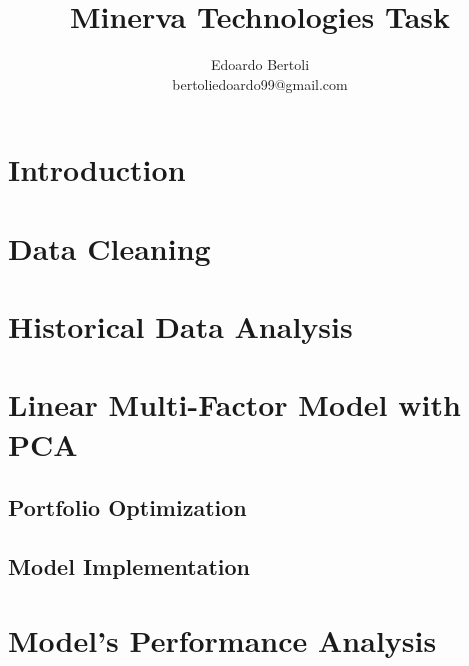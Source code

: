\documentclass[a4paper,11pt]{article}
\title{Minerva Technologies Task}
\author{Edoardo Bertoli\\bertoliedoardo99@gmail.com}
\begin{document}
\maketitle


\tableofcontents
\thispagestyle{empty} 
\clearpage





\section{Introduction}
\label{intro}


\section{Data Cleaning}
\label{datacleaning}


\section{Historical Data Analysis}
\label{dataanalysis}


\section{Linear Multi-Factor Model with PCA}
\label{pca-apt}

\subsection{Portfolio Optimization}
\label{optimization}

\subsection{Model Implementation}
\label{implementation}


\section{Model's Performance Analysis}
\label{model-testing}



\clearpage
{}
\printbibliography
\end{document}
